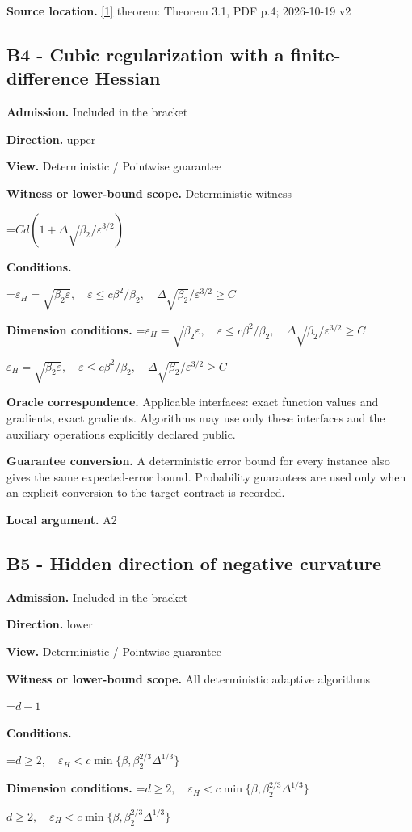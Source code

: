 \documentclass[10pt,a4paper]{article}
\newcommand{\AtlasMath}[1]{\par\begingroup\centering\setbox0=\hbox{$\displaystyle #1$}\ifdim\wd0>1.4\linewidth\typeout{ATLAS WIDE FORMULA: \the\wd0}\fi\ifdim\wd0>\linewidth\resizebox{\linewidth}{!}{\box0}\else\box0\fi\par\endgroup}
\newcommand{\AtlasInlineMath}[1]{\begingroup\setbox0=\hbox{$#1$}\ifdim\wd0>.4\linewidth\endgroup\AtlasMath{#1}\else\endgroup$#1$\fi}
\begin{document}
\textbf{Source location.} \href{https://arxiv.org/pdf/2610.00245v2}{[1]} theorem: Theorem 3.1, PDF p.4; 2026-10-19 v2

\subsection{B4 - Cubic regularization with a finite-difference Hessian}
\textbf{Admission.} Included in the bracket

\textbf{Direction.} upper

\textbf{View.} Deterministic / Pointwise guarantee

\textbf{Witness or lower-bound scope.} Deterministic witness

\AtlasMath{Cd(1+\Delta\sqrt{\beta_2}/\varepsilon^{3/2})}
\textbf{Conditions.} 
\AtlasMath{\varepsilon_H=\sqrt{\beta_2\varepsilon},\quad\varepsilon\le c\beta^2/\beta_2,\quad\Delta\sqrt{\beta_2}/\varepsilon^{3/2}\ge C}


\textbf{Dimension conditions.} \AtlasInlineMath{\varepsilon_H=\sqrt{\beta_2\varepsilon},\quad\varepsilon\le c\beta^2/\beta_2,\quad\Delta\sqrt{\beta_2}/\varepsilon^{3/2}\ge C}

\textbf{Oracle correspondence.} Applicable interfaces: exact function values and gradients, exact gradients. Algorithms may use only these interfaces and the auxiliary operations explicitly declared public.

\textbf{Guarantee conversion.} A deterministic error bound for every instance also gives the same expected-error bound. Probability guarantees are used only when an explicit conversion to the target contract is recorded.

\textbf{Local argument.} A2

\subsection{B5 - Hidden direction of negative curvature}
\textbf{Admission.} Included in the bracket

\textbf{Direction.} lower

\textbf{View.} Deterministic / Pointwise guarantee

\textbf{Witness or lower-bound scope.} All deterministic adaptive algorithms

\AtlasMath{d-1}
\textbf{Conditions.} 
\AtlasMath{d\ge2,\quad\varepsilon_H<c\min\{\beta,\beta_2^{2/3}\Delta^{1/3}\}}


\textbf{Dimension conditions.} \AtlasInlineMath{d\ge2,\quad\varepsilon_H<c\min\{\beta,\beta_2^{2/3}\Delta^{1/3}\}}
\end{document}
